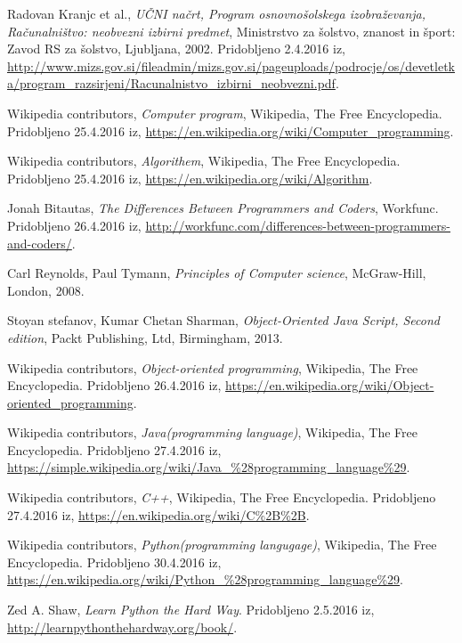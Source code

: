 \begin{thebibliography}{9}
 Radovan Kranjc et al., \emph{UČNI
    načrt, Program osnovnošolskega izobraževanja, Računalništvo:
    neobvezni izbirni predmet}, Ministrstvo za šolstvo, znanost in
  šport: Zavod RS za šolstvo, Ljubljana, 2002. Pridobljeno 2.4.2016
  iz,
  \url{http://www.mizs.gov.si/fileadmin/mizs.gov.si/pageuploads/podrocje/os/devetletka/program_razsirjeni/Racunalnistvo_izbirni_neobvezni.pdf}.

 Wikipedia contributors, \emph{Computer
    program}, Wikipedia, The Free Encyclopedia. Pridobljeno 25.4.2016
  iz,
  \url{https://en.wikipedia.org/wiki/Computer_programming}.


 Wikipedia contributors, \emph{Algorithem},
  Wikipedia, The Free Encyclopedia. Pridobljeno 25.4.2016 iz,
  \url{https://en.wikipedia.org/wiki/Algorithm}.

 Jonah Bitautas, \emph{The Differences Between
    Programmers and Coders}, Workfunc. Pridobljeno 26.4.2016 iz,
  \url{http://workfunc.com/differences-between-programmers-and-coders/}.

 Carl Reynolds, Paul Tymann, \emph{Principles of Computer science},
  McGraw-Hill, London, 2008.

 Stoyan stefanov, Kumar Chetan Sharman, \emph{Object-Oriented Java Script,
    Second edition}, Packt Publishing, Ltd, Birmingham, 2013.

 Wikipedia contributors, \emph{Object-oriented
    programming}, Wikipedia, The Free Encyclopedia. Pridobljeno
  26.4.2016 iz,
  \url{https://en.wikipedia.org/wiki/Object-oriented_programming}.

 Wikipedia contributors, \emph{Java(programming
    language)}, Wikipedia, The Free Encyclopedia. Pridobljeno
  27.4.2016 iz,
  \url{https://simple.wikipedia.org/wiki/Java_%28programming_language%29}.

 Wikipedia contributors, \emph{C++}, Wikipedia, The
  Free Encyclopedia. Pridobljeno 27.4.2016 iz,
  \url{https://en.wikipedia.org/wiki/C%2B%2B}.

 Wikipedia contributors, \emph{Python(programming
    langugage)}, Wikipedia, The
  Free Encyclopedia. Pridobljeno 30.4.2016 iz,
  \url{https://en.wikipedia.org/wiki/Python_%28programming_language%29}.

  Zed A. Shaw, \emph{Learn Python the Hard Way}. Pridobljeno 2.5.2016
  iz, \url{http://learnpythonthehardway.org/book/}.





\end{thebibliography}
